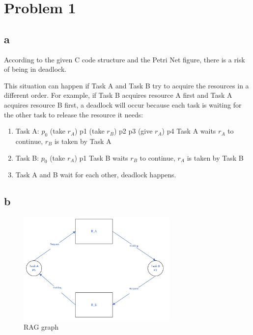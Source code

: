 \section{Problem 1}

\subsection{a}

According to the given C code structure and the Petri Net figure, there is a risk of being in deadlock.

This situation can happen if Task A and Task B try to acquire the resources in a different order. For example, if Task B acquires resource A first and Task A acquires resource B first, a deadlock will occur because each task is waiting for the other task to release the resource it needs:

\begin{enumerate}
    \item Task A: $ p_0 $ \rightarrow(take $ r_A $) p1 \rightarrow(take $ r_B $) p2 \rightarrow p3 \rightarrow(give $ r_A $) p4 
    \subitem Task A waits $ r_A $ to continue, $ r_B $ is taken by Task A
    \item Task B: $ p_0 $ \rightarrow(take $ r_A $) p1 
    \subitem Task B waits $ r_B $ to continue, $ r_A $ is taken by Task B 
    \item Task A and B wait for each other, deadlock happens.
\end{enumerate}

\subsection{b}

\begin{figure}[H]
 \centering
 \includegraphics[width=0.7\textwidth]{images/rag.png}
 \caption{RAG graph}
 \label{rag}
\end{figure}

